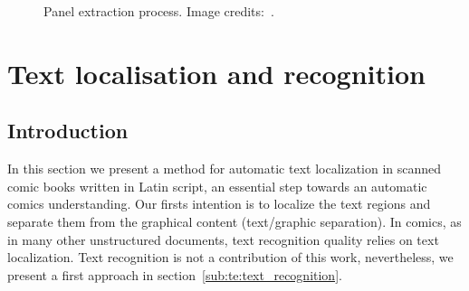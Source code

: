\begin{figure}
	  \hspace{1em}
	  \caption[Independent panel extraction process]{Panel extraction process. Image credits:~\cite{Lubbin12}.}
	  \label{fig:in:panel_detection_process}
\end{figure}


\section{Text localisation and recognition} %
\label{sec:in:text_localisation_and_recognition}
\subsection{Introduction} %
\label{sub:introduction}

In this section we present a method for automatic text localization in scanned comic books written in Latin script, an essential step towards an automatic comics understanding.
Our firsts intention is to localize the text regions and separate them from the graphical content (text/graphic separation).
In comics, as in many other unstructured documents, text recognition quality relies on text localization.
Text recognition is not a contribution of this work, nevertheless, we present a first approach in section~\ref{sub:te:text_recognition}.


